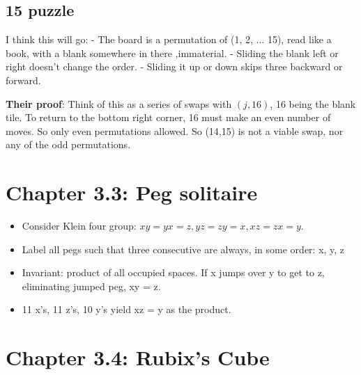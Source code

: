 \documentclass[11pt, oneside]{article}   	%
\begin{document}
 \subsection{15 puzzle}
 I think this will go:
 - The board is a permutation of (1, 2, ... 15), read like a book, with a blank  somewhere in there ,immaterial.
 - Sliding the blank left or right doesn't change the order.
 - Sliding it up or down skips three backward or forward.
 
\textbf{Their proof}: Think of this as a series of swaps with $(j, 16)$, 16 being the blank tile.  To return to the bottom right corner, 16 must make an even number of moves.  So only even permutations allowed.  So (14,15) is not a viable swap, nor any of the odd permutations.  

\section{Chapter 3.3: Peg solitaire}

\begin{itemize}
\item Consider Klein four group: $xy = yx = z, yz = zy = x, xz = zx = y$.  
\item Label all pegs such that three consecutive are always, in some order: x, y, z
\item Invariant: product of all occupied spaces.  If x jumps over y to get to z, eliminating jumped peg, xy = z.
\item 11  x's, 11 z's, 10 y's yield xz = y as the product.
\end{itemize}

\section{Chapter 3.4: Rubix's Cube}
\end{document}
